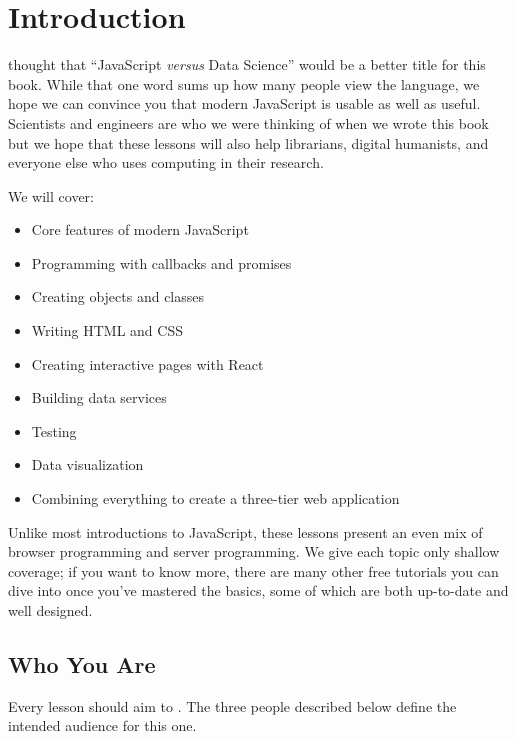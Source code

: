 \chapter{Introduction}\label{s:intro}

 thought that ``JavaScript \emph{versus} Data Science''
would be a better title for this book.
While that one word sums up how many people view the language,
we hope we can convince you that modern JavaScript is usable as well as useful.
Scientists and engineers are who we were thinking of when we wrote this book
but we hope that these lessons will also help librarians,
digital humanists,
and everyone else who uses computing in their research.

We will cover:

\begin{itemize}
\item
  Core features of modern JavaScript
\item
  Programming with callbacks and promises
\item
  Creating objects and classes
\item
  Writing HTML and CSS
\item
  Creating interactive pages with React
\item
  Building data services
\item
  Testing
\item
  Data visualization
\item
  Combining everything to create a three-tier web application
\end{itemize}

Unlike most introductions to JavaScript,
these lessons present an even mix of browser programming and server programming.
We give each topic only shallow coverage;
if you want to know more,
there are many other free tutorials you can dive into once you've mastered the basics,
some of which are both up-to-date and well designed.

\section{Who You Are}\label{s:intro-personas}

Every lesson should aim to  \cite{Wils2019}.
The three people described below define the intended audience for this one.

